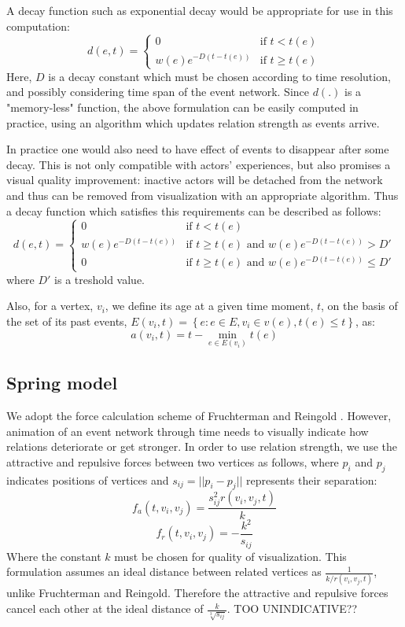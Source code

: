\documentclass{article}
\begin{document}
A decay function such as exponential decay would be appropriate for use in this computation: 
\[d(e,t)=\left\{ \begin{array}{ll} 0 & \textrm{if $t<t(e)$} \\ w(e) e^{-D (t-t(e))} & \textrm{if $t\ge t(e)$}\end{array}\right.\]
Here, $D$ is a decay constant which must be chosen according to time resolution, and possibly considering time span of the event network. Since $d(.)$ is a "memory-less" function, the above formulation can be easily computed in practice, using an algorithm which updates relation strength as events arrive.

In practice one would also need to have effect of events to disappear after some decay. This is not only compatible with actors' experiences, but also promises a visual quality improvement: inactive actors will be detached from the network and thus can be removed from visualization with an appropriate algorithm. Thus a decay function which satisfies this requirements can be described as follows:
\[
d(e,t)=\left\{ \begin{array}{ll} 
 0 & \textrm{if $t<t(e)$} \\
 w(e) e^{-D (t-t(e))} & \textrm{if $t\ge t(e)$ and $w(e) e^{-D (t-t(e))} > D'$} \\ 
 0 & \textrm{if $t\ge t(e)$ and $w(e) e^{-D (t-t(e))} \le D'$} 
 \end{array}\right. \]
where $D'$ is a treshold value.

Also, for a vertex, $v_i$, we define its age at a given time moment, $t$, on the basis of the set of its past events, $E(v_i,t)=\left\{e:  e\in E, v_i \in v(e), t(e)\le t\right\}$, as:
\[ a(v_i, t)=t- \min_{e \in E(v_i)}t(e) \]

\subsection{Spring model}
We adopt the force calculation scheme of Fruchterman and Reingold \citeyearpar{Fruchterman}. However, animation of an event network through time needs to visually indicate how relations deteriorate or get stronger. In order to use relation strength, we use the attractive and repulsive forces between two vertices as follows, where $p_i$ and $p_j$ indicates positions of vertices and $s_{ij}=||p_i-p_j||$ represents their separation:
\[f_a(t,v_i,v_j)=\frac{s_{ij}^2 r(v_i,v_j,t)}{k}\]
\[f_r(t,v_i,v_j)=-\frac{k^2}{s_{ij}}\]
Where the constant $k$ must be chosen for quality of visualization. This formulation assumes an ideal distance between related vertices as $\frac{1}{k/r(v_i,v_j,t)}$, unlike Fruchterman and Reingold. Therefore the attractive and repulsive forces cancel each other at the ideal distance of $\frac{k}{\sqrt[3]{s_{ij}}}$. TOO UNINDICATIVE??
\end{document}
